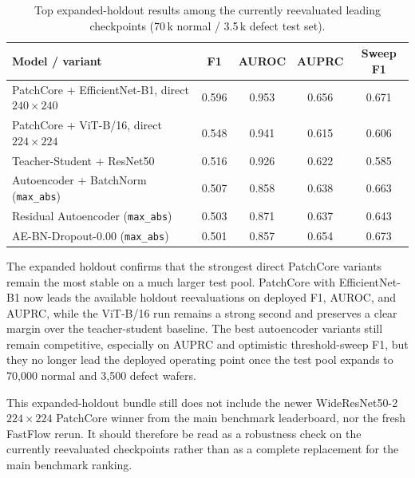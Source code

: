 \documentclass[11pt]{article}
\begin{document}
\begin{table}[H]
\centering
\caption{Top expanded-holdout results among the currently reevaluated leading checkpoints
(70\,k normal / 3.5\,k defect test set).}
\label{tab:holdout_leaderboard}
\begin{tabularx}{\linewidth}{>{\raggedright\arraybackslash}Xcccc}
\toprule
Model / variant & F1 & AUROC & AUPRC & Sweep F1 \\
\midrule
PatchCore + EfficientNet-B1, direct $240{\times}240$ & 0.596 & 0.953 & 0.656 & 0.671 \\
PatchCore + ViT-B/16, direct $224{\times}224$       & 0.548 & 0.941 & 0.615 & 0.606 \\
Teacher-Student + ResNet50                          & 0.516 & 0.926 & 0.622 & 0.585 \\
Autoencoder + BatchNorm (\texttt{max\_abs})        & 0.507 & 0.858 & 0.638 & 0.663 \\
Residual Autoencoder (\texttt{max\_abs})           & 0.503 & 0.871 & 0.637 & 0.643 \\
AE-BN-Dropout-0.00 (\texttt{max\_abs})             & 0.501 & 0.857 & 0.654 & 0.673 \\
\bottomrule
\end{tabularx}
\end{table}

The expanded holdout confirms that the strongest direct PatchCore variants remain
the most stable on a much larger test pool. PatchCore with EfficientNet-B1 now
leads the available holdout reevaluations on deployed F1, AUROC, and AUPRC,
while the ViT-B/16 run remains a strong second and preserves a clear margin over
the teacher-student baseline. The best autoencoder variants still remain
competitive, especially on AUPRC and optimistic threshold-sweep F1, but they no
longer lead the deployed operating point once the test pool expands to
70{,}000 normal and 3{,}500 defect wafers.

This expanded-holdout bundle still does not include the newer WideResNet50-2
$224{\times}224$ PatchCore winner from the main benchmark leaderboard, nor the
fresh FastFlow rerun. It should therefore be read as a robustness check on the
currently reevaluated checkpoints rather than as a complete replacement for the
main benchmark ranking.
\end{document}
